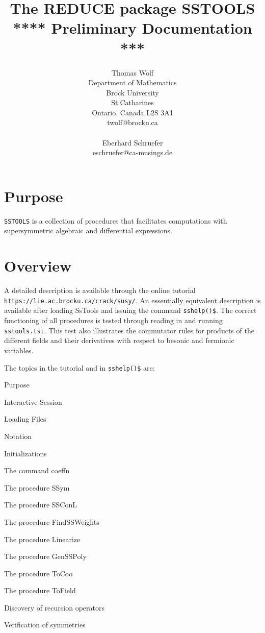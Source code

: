 \documentclass[12pt]{article}
\title{The REDUCE package SSTOOLS \\
       **** Preliminary Documentation ***}
\author{Thomas Wolf \\                        
        Department of Mathematics \\
        Brock University \\
        St.Catharines \\
        Ontario, Canada L2S 3A1 \\
        twolf@brocku.ca \\
        \\
        Eberhard Schruefer \\
        eschruefer@ca-musings.de}
\begin{document}
\maketitle
\section{Purpose}
{\tt SSTOOLS} is a collection of procedures
that facilitates computations with supersymmetric algebraic and differential
expressions.

\section{Overview}
A detailed description is available through the online tutorial \\
{\tt https://lie.ac.brocku.ca/crack/susy/}. An essentially equivalent 
description is available after loading {\sc SsTools} and issuing the command
{\tt sshelp()\$}. The correct functioning of all procedures is tested through
reading in and running {\tt sstools.tst}. This test also illustrates
the commutator rules for products of the different fields and their
derivatives with respect to besonic and fermionic variables.

The topics in the tutorial and in {\tt sshelp()\$} are:
\begin{description} \itemsep -3pt
\item{Purpose}
\item{Interactive Session}
\item{Loading Files}
\item{Notation}
\item{Initializations}
\item{The command coeffn}
\item{The procedure SSym}
\item{The procedure SSConL}
\item{The procedure FindSSWeights}
\item{The procedure Linearize}
\item{The procedure GenSSPoly}
\item{The procedure ToCoo}
\item{The procedure ToField}
\item{Discovery of recursion operators}
\item{Verification of symmetries}
\end{description}
\end{document}

